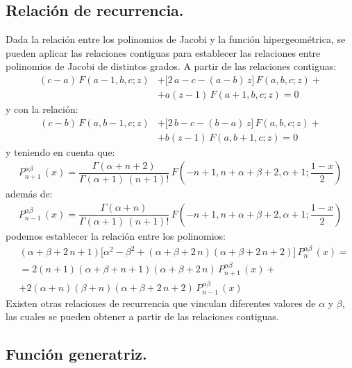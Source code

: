 \subsection{Relación de recurrencia.}

Dada la relación entre los polinomios de Jacobi y la función hipergeométrica, se pueden aplicar las relaciones contiguas para establecer las relaciones entre polinomios de Jacobi de distintos grados. A partir de las relaciones contiguas:
\begin{align*}
(c - a) \, F(a - 1, b, c; z) &+ \big[ 2 \, a - c - (a - b) \, z \big] \, F(a, b, c; z) + \\[0.5em]
&+ a(z - 1) \, F( a + 1, b, c; z) = 0
\end{align*}
y con la relación:
\begin{align*}
(c - b) \, F(a, b - 1, c; z) &+ \big[ 2 \, b - c - (b - a) \, z \big] \, F(a, b, c; z) + \\[0.5em]
&+ b(z - 1) \, F( a, b + 1, c; z) = 0
\end{align*}
y teniendo en cuenta que:
\begin{align*}
P_{n+1}^{\alpha \beta} \, (x) = \dfrac{\Gamma (\alpha + n + 2)}{\Gamma (\alpha + 1) \, (n + 1)!} \, F \left( -n + 1, n + \alpha + \beta + 2, \alpha + 1; \dfrac{1 - x}{2} \right)
\end{align*}
además de:
\begin{align*}
P_{n-1}^{\alpha \beta} \, (x) = \dfrac{\Gamma (\alpha + n)}{\Gamma (\alpha + 1) \, (n + 1)!} \, F \left( -n + 1, n + \alpha + \beta + 2, \alpha + 1; \dfrac{1 - x}{2} \right)
\end{align*}
podemos establecer la relación entre los polinomios:
\begin{align*}
&(\alpha + \beta + 2 \, n + 1) \big[ \alpha^{2} - \beta^{2} + (\alpha + \beta + 2 \, n)(\alpha + \beta + 2 \, n + 2) \big] \, P_{n}^{\alpha \beta} \, (x) = \\[0.5em]
&= 2 (n + 1)(\alpha + \beta + n + 1)(\alpha + \beta +  2 \, n) \, P_{n+1}^{\alpha \beta} \, (x) + \\[0.5em]
&+ 2 (\alpha + n)(\beta + n)(\alpha + \beta +  2 \, n + 2) \, P_{n-1}^{\alpha \beta} \, (x)
\end{align*}
Existen otras relaciones de recurrencia que vinculan diferentes valores de $\alpha$ y $\beta$, las cuales se pueden obtener a partir de las relaciones contiguas.

\subsection{Función generatriz.}

